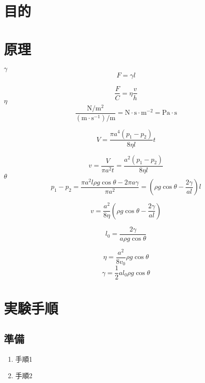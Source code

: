 \documentclass[a4j]{jarticle}
\begin{document}
\section{目的}

\section{原理}
$\gamma$
\begin{equation}
F=\gamma l
\end{equation}


\begin{equation}
\frac{F}{C} = \eta \frac{v}{h}
\end{equation}
$\eta$
\begin{equation}
\mathrm{\frac{N/m^2}{(m \cdot s^{-1} )/m } = N \cdot s \cdot m^{-2} = Pa \cdot s} 
\end{equation}

\begin{equation}
V= \frac{\pi a^4(p_1-p_2)}{8 \eta l} t
\end{equation}

\begin{equation}
v=\frac{V}{\pi a^2 t} = \frac{a^2 ( p_1 - p_2)}{8\eta l}
\end{equation}
$\theta$
\begin{equation}
p_1-p_2 = \frac{\pi a^2 l \rho g \cos{\theta}-2\pi a \gamma}{\pi a^2} = \left( \rho g \cos\theta - \frac{2 \gamma}{al} \right) l
\end{equation}

\begin{equation}
v=\frac{a^2}{8 \eta}\left( \rho g \cos\theta - \frac{2 \gamma}{al} \right)
\end{equation}

\begin{equation}
l_0 = \frac{2\gamma}{a \rho g \cos \theta}
\end{equation}

\begin{equation}
\label{eq:eq1}
\eta = \frac{a^2}{8v_0}\rho g \cos \theta
\end{equation}
\begin{equation}
\label{eq:eq2}
\gamma = \frac{1}{2} a l_0 \rho g \cos \theta
\end{equation}

\section{実験手順}
\subsection{準備}
\begin{enumerate}
\item 手順1
\item 手順2
\end{enumerate}
\end{document}
